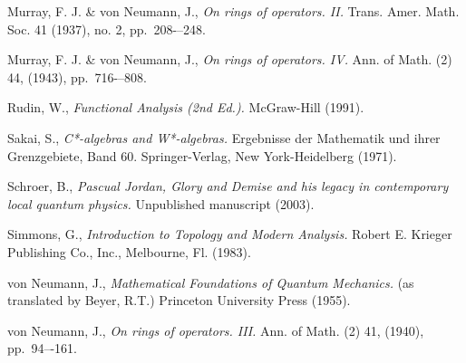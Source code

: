 \documentclass[12pt,a4paper]{report}
\theoremstyle{plain}
\theoremstyle{definition}
\newcommand{\1}{\mathbbm{1}}
\begin{document}
\begin{thebibliography}{00}
	Murray, F. J. \& von Neumann, J.,
	\emph{On rings of operators. II.}
	Trans. Amer. Math. Soc. 41 (1937), no. 2, pp.~208-–248. 

	Murray, F. J. \& von Neumann, J.,
	\emph{On rings of operators. IV.}
	Ann. of Math. (2) 44, (1943), pp.~716-–808.

	Rudin, W.,
	\emph{Functional Analysis (2nd Ed.).}
	McGraw-Hill (1991).

	Sakai, S.,
	\emph{C*-algebras and W*-algebras.}
	Ergebnisse der Mathematik und ihrer Grenzgebiete, Band 60. Springer-Verlag, New York-Heidelberg 
	(1971).

	Schroer, B.,
	\emph{Pascual Jordan, Glory and Demise and his legacy in contemporary local quantum physics.}
	Unpublished manuscript (2003).
	
	Simmons, G.,
	\emph{Introduction to Topology and Modern Analysis.}
	Robert E. Krieger Publishing Co., Inc., Melbourne, Fl. (1983).

	von Neumann, J.,
	\emph{Mathematical Foundations of Quantum Mechanics.}
	(as translated by Beyer, R.T.)
	Princeton University Press (1955).

	von Neumann, J.,
	\emph{On rings of operators. III.}
	Ann. of Math. (2) 41, (1940), pp.~94–-161.

	
\end{thebibliography}
\end{document}
